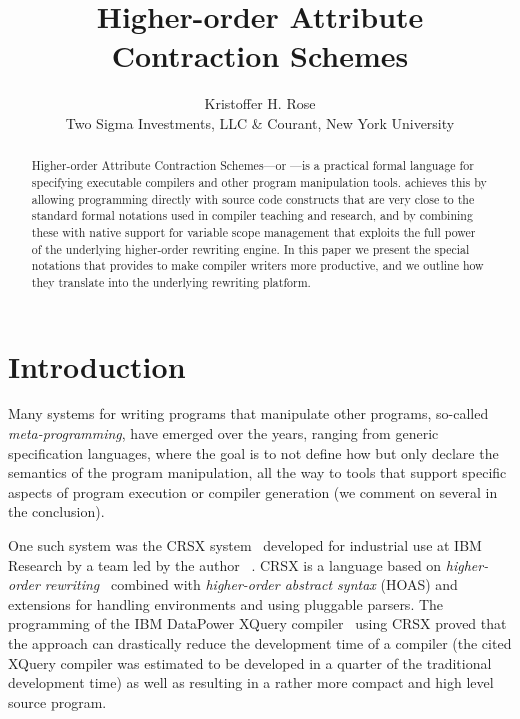 \documentclass[letterpaper]{article}
\title{ Higher-order Attribute Contraction Schemes }
\author{ Kristoffer H. Rose \\
 Two Sigma Investments, LLC \& Courant, New York University }
\begin{document}
\maketitle

\begin{abstract}
  Higher-order Attribute Contraction Schemes---or \HAX---is a practical formal language for
  specifying executable compilers and other program manipulation tools. \HAX achieves this by
  allowing programming directly with source code constructs that are very close to the standard
  formal notations used in compiler teaching and research, and by combining these with native
  support for variable scope management that exploits the full power of the underlying higher-order
  rewriting engine.  In this paper we present the special notations that \HAX provides to make
  compiler writers more productive, and we outline how they translate into the underlying rewriting
  platform.
\end{abstract}


\section{Introduction}\label{sec:intro}

Many systems for writing programs that manipulate other programs, so-called \emph{meta-programming},
have emerged over the years, ranging from generic specification languages, where the goal is to not
define how but only declare the semantics of the program manipulation, all the way to tools that
support specific aspects of program execution or compiler generation (we comment on several in the
conclusion).

One such system was the CRSX system~\cite{Rose:1996} developed for industrial use at IBM Research by
a team led by the author~\cite{Rose:hor2007,Rose:hor2010,Rose:rta2011,crsx} .  CRSX is a language
based on \emph{higher-order rewriting}~\cite{Jouannaud:klop2005} combined with \emph{higher-order
  abstract syntax} (HOAS) \cite{PfenningElliot:pldi1988} and extensions for handling environments
and using pluggable parsers.  The programming of the IBM Data\-Power XQuery
compiler~\cite{dp60:ibm2013} using CRSX proved that the approach can drastically reduce the
development time of a compiler (the cited XQuery compiler was estimated to be developed in a quarter
of the traditional development time) as well as resulting in a rather more compact and high level
source program.
\end{document}
